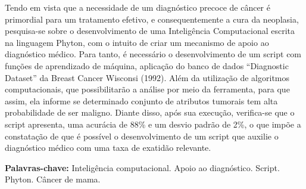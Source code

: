 Tendo em vista que a necessidade de um diagnóstico precoce de câncer é primordial para um tratamento efetivo, 
e consequentemente a cura da neoplasia,
pesquisa-se sobre o desenvolvimento de uma Inteligência Computacional escrita na linguagem Phyton,
com o intuito de criar um mecanismo de apoio ao diagnóstico médico.
Para tanto, é necessário o desenvolvimento de um script com funções de aprendizado de máquina, 
aplicação do banco de dados “Diagnostic Dataset” da Breast Cancer Wisconsi (1992). 
Além da utilização de algoritmos computacionais, 
que possibilitarão a análise por meio da ferramenta, para que assim, 
ela informe se determinado conjunto de atributos tumorais tem alta probabilidade de ser maligno.  
Diante disso, após sua execução, verifica-se que o script apresenta, uma acurácia de 88\% e um desvio padrão de 2\%,
o que impõe a constatação de que é possível o desenvolvimento de um script que auxilie o diagnóstico médico com uma taxa de exatidão relevante.
\vspace{\onelineskip}

\noindent 

\textbf{Palavras-chave:} Inteligência computacional. Apoio ao diagnóstico. Script. Phyton. Câncer de mama.
